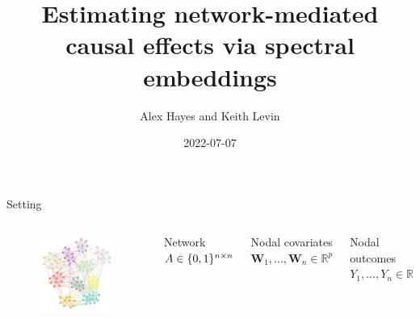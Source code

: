 \documentclass{beamer}
\title{Estimating network-mediated causal effects via spectral embeddings}
\date{2022-07-07}
\author{Alex Hayes and Keith Levin}
\institute{University of Wisconsin-Madison}
\theoremstyle{remark}
\newcommand{\W}{\bm W}
\newcommand \R {\mathbb{R}}
\DeclarePairedDelimiter{\set}{\{}{\}}
\begin{document}
\maketitle

\begin{frame}{Setting}
    \begin{columns}

        \begin{figure}
            \includegraphics[width=\textwidth]{figures/assortative.png}
        \end{figure}


        Network $A \in \set{0, 1}^{n \times n}$

        Nodal covariates $\W_1, ..., \W_n \in \R^{p}$

        Nodal outcomes $Y_1, ..., Y_n \in \R$

    \end{columns}
\end{frame}
\end{document}
